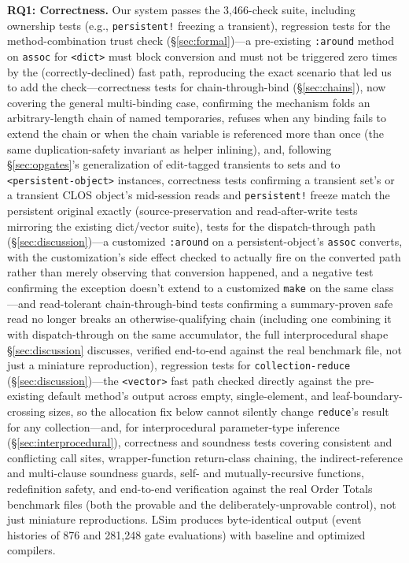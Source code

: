 \documentclass[sigplan,review,anonymous]{acmart}
\begin{document}
\textbf{RQ1: Correctness.} Our system passes the 3,466-check suite, including ownership tests (e.g., \texttt{persistent!} freezing a transient), regression tests for the method-combination trust check (§\ref{sec:formal})---a pre-existing \texttt{:around} method on \texttt{assoc} for \texttt{<dict>} must block conversion and must not be triggered zero times by the (correctly-declined) fast path, reproducing the exact scenario that led us to add the check---correctness tests for chain-through-bind (§\ref{sec:chains}), now covering the general multi-binding case, confirming the mechanism folds an arbitrary-length chain of named temporaries, refuses when any binding fails to extend the chain or when the chain variable is referenced more than once (the same duplication-safety invariant as helper inlining), and, following §\ref{sec:opgates}'s generalization of edit-tagged transients to sets and to \texttt{<persistent-object>} instances, correctness tests confirming a transient set's or a transient CLOS object's mid-session reads and \texttt{persistent!} freeze match the persistent original exactly (source-preservation and read-after-write tests mirroring the existing dict/vector suite), tests for the dispatch-through path (§\ref{sec:discussion})---a customized \texttt{:around} on a persistent-object's \texttt{assoc} converts, with the customization's side effect checked to actually fire on the converted path rather than merely observing that conversion happened, and a negative test confirming the exception doesn't extend to a customized \texttt{make} on the same class---and read-tolerant chain-through-bind tests confirming a summary-proven safe read no longer breaks an otherwise-qualifying chain (including one combining it with dispatch-through on the same accumulator, the full interprocedural shape §\ref{sec:discussion} discusses, verified end-to-end against the real benchmark file, not just a miniature reproduction), regression tests for \texttt{collection-reduce} (§\ref{sec:discussion})---the \texttt{<vector>} fast path checked directly against the pre-existing default method's output across empty, single-element, and leaf-boundary-crossing sizes, so the allocation fix below cannot silently change \texttt{reduce}'s result for any collection---and, for interprocedural parameter-type inference (§\ref{sec:interprocedural}), correctness and soundness tests covering consistent and conflicting call sites, wrapper-function return-class chaining, the indirect-reference and multi-clause soundness guards, self- and mutually-recursive functions, redefinition safety, and end-to-end verification against the real Order Totals benchmark files (both the provable and the deliberately-unprovable control), not just miniature reproductions. LSim produces byte-identical output (event histories of 876 and 281,248 gate evaluations) with baseline and optimized compilers.
\end{document}
